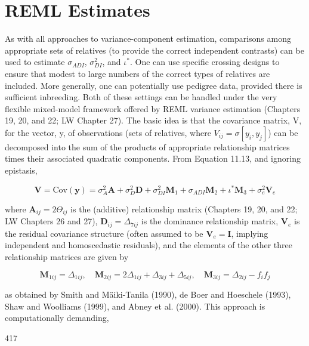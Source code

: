 \documentclass{article}
\begin{document}
\section{REML Estimates}
As with all approaches to variance-component estimation, comparisons among appropriate sets of relatives (to provide the correct independent contrasts) can be used to estimate  $ \sigma_{ADI} $,  $ \sigma_{DI}^{2} $, and  $ \iota^{*} $. One can use specific crossing designs to ensure that modest to large numbers of the correct types of relatives are included. More generally, one can potentially use pedigree data, provided there is sufficient inbreeding. Both of these settings can be handled under the very flexible mixed-model framework offered by REML variance estimation (Chapters 19, 20, and 22; LW Chapter 27). The basic idea is that the covariance matrix, V, for the vector, y, of observations (sets of relatives, where  $ V_{ij} = \sigma[y_i, y_j] $) can be decomposed into the sum of the products of appropriate relationship matrices times their associated quadratic components. From Equation 11.13, and ignoring epistasis,

\begin{equation}
\mathbf{V}=\mathrm{Cov}(\mathbf{y})=\sigma_{A}^{2}\mathbf{A}+\sigma_{D}^{2}\mathbf{D}+\sigma_{D I}^{2}\mathbf{M}_{1}+\sigma_{A D I}\mathbf{M}_{2}+\iota^{*}\mathbf{M}_{3}+\sigma_{e}^{2}\mathbf{V}_{e}
\tag{11.19a}
\label{eq:11_19a}
\end{equation}

where  $ \mathbf{A}_{ij} = 2\Theta_{ij} $ is the (additive) relationship matrix (Chapters 19, 20, and 22; LW Chapters 26 and 27),  $ \mathbf{D}_{ij} = \Delta_{7ij} $ is the dominance relationship matrix,  $ \mathbf{V}_e $ is the residual covariance structure (often assumed to be  $ \mathbf{V}_e = \mathbf{I} $, implying independent and homoscedastic residuals), and the elements of the other three relationship matrices are given by

\begin{equation}
\mathbf{M}_{1ij}=\Delta_{1ij},\quad\mathbf{M}_{2ij}=2\Delta_{1ij}+\Delta_{3ij}+\Delta_{5ij},\quad\mathbf{M}_{3ij}=\Delta_{2ij}-f_{i}f_{j}
\tag{11.19b}
\label{eq:11_19b}
\end{equation}

as obtained by Smith and Mäiki-Tanila (1990), de Boer and Hoeschele (1993), Shaw and Woolliams (1999), and Abney et al. (2000). This approach is computationally demanding,

417
\end{document}
